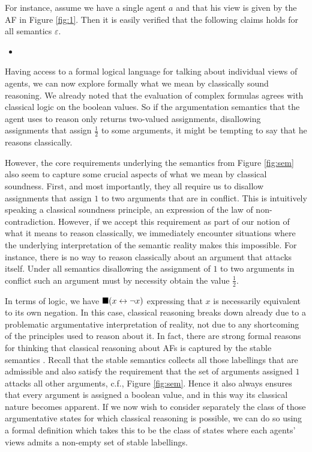 \documentclass[greybox]{svmult}
\newcommand{\sem}{\varepsilon}
\begin{document}
For instance, assume we have a single agent $a$ and that his view is given by the AF in Figure \ref{fig:1}. Then it is easily verified that the following claims holds for all semantics $\sem$.
\begin{itemize}
\item 
\end{itemize}

Having access to a formal logical language for talking about individual views of agents, we can now explore formally what we mean by classically sound reasoning. We already noted that the evaluation of complex formulas agrees with classical logic on the boolean values. So if the argumentation semantics that the agent uses to reason only returns two-valued assignments, disallowing assignments that assign $\frac{1}{2}$ to some arguments, it might be tempting to say that he reasons classically. 

However, the core requirements underlying the semantics from Figure \ref{fig:sem} also seem to capture some crucial aspects of what we mean by classical soundness. First, and most importantly, they all require us to disallow assignments that assign $1$ to two arguments that are in conflict. This is intuitively speaking a classical soundness principle, an expression of the law of non-contradiction. However, if we accept this requirement as part of our notion of what it means to reason classically, we immediately encounter situations where the underlying interpretation of the semantic reality makes this impossible. For instance, there is no way to reason classically about an argument that attacks itself. Under all semantics disallowing the assignment of $1$ to two arguments in conflict such an argument must by necessity obtain the value $\frac{1}{2}$.

In terms of logic, we have $\blacksquare (x \leftrightarrow \neg x)$ expressing that $x$ is necessarily equivalent to its own negation. In this case, classical reasoning breaks down already due to a problematic argumentative interpretation of reality, not due to any shortcoming of the principles used to reason about it. In fact, there are strong formal reasons for thinking that classical reasoning about AFs is captured by the stable semantics \cite{dyrkolbotn}. Recall that the stable semantics collects all those labellings that are admissible and also satisfy the requirement that the set of arguments assigned $1$ attacks all other arguments, c.f., Figure \ref{fig:sem}. Hence it also always ensures that every argument is assigned a boolean value, and in this way its classical nature becomes apparent. If we now wish to consider separately the class of those argumentative states for which classical reasoning is possible, we can do so using a formal definition which takes this to be the class of states where each agents' views admits a non-empty set of stable labellings.
\end{document}
